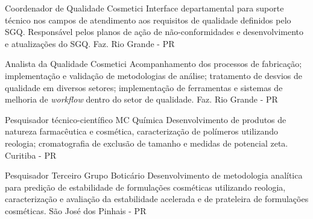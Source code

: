 {Coordenador de Qualidade}
{Cosmetici}
{
Interface departamental para suporte técnico nos campos de
atendimento aos requisitos de qualidade definidos pelo SGQ.
Responsável pelos planos de ação de não-conformidades e desenvolvimento 
e atualizações do SGQ.
}
{Faz. Rio Grande - PR}

{Analista da Qualidade}
{Cosmetici}
{
    Acompanhamento dos processos de fabricação;
    implementação e validação de metodologias de análise;
    tratamento de desvios de qualidade em diversos setores;
    implementação de ferramentas e sistemas de melhoria de \emph{workflow} 
    dentro do setor de qualidade.
}
{Faz. Rio Grande - PR}






{Pesquisador técnico-científico}
{MC Química}
{
    Desenvolvimento de produtos de natureza farmacêutica e cosmética, 
    caracterização de polímeros utilizando reologia;
    cromatografia de exclusão de tamanho e medidas de potencial zeta.
}
{Curitiba - PR}

{Pesquisador Terceiro}
{Grupo Boticário}
{
Desenvolvimento de metodologia analítica para predição de estabilidade
de formulações cosméticas utilizando reologia,
caracterização e avaliação da estabilidade acelerada e de prateleira
de formulações cosméticas.
}
{São José dos Pinhais - PR}

